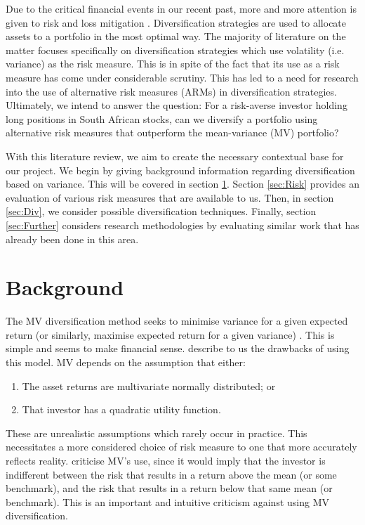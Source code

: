 \documentclass[12pt,a4paper]{article}
\newcommand{\be}{\begin{enumerate}}
\newcommand{\ee}{\end{enumerate}}
\begin{document}
Due to the critical financial events in our recent past, more and more attention is given to risk and loss mitigation \citep{righi2017simulation}. Diversification strategies are used to allocate assets to a portfolio in the most optimal way. The majority of literature on the matter focuses specifically on diversification strategies which use volatility (i.e. variance) as the risk measure. This is in spite of the fact that its use as a risk measure has come under considerable scrutiny. This has led to a need for research into the use of alternative risk measures (ARMs) in diversification strategies. Ultimately, we intend to answer the question: For a risk-averse investor holding long positions in South African stocks, can we diversify a portfolio using alternative risk measures that outperform the mean-variance (MV) portfolio?

With this literature review, we aim to create the necessary contextual base for our project. We begin by giving background information regarding diversification based on variance. This will be covered in section \ref{sec:Back}. Section \ref{sec:Risk} provides an evaluation of various risk measures that are available to us. Then, in section \ref{sec:Div}, we consider possible diversification techniques. Finally, section \ref{sec:Further} considers research methodologies by evaluating similar work that has already been done in this area.

\section{Background}
\label{sec:Back}

The MV diversification method seeks to minimise variance for a given expected return (or similarly, maximise expected return for a given variance) \citep{markowitz1952portfolio}. This is simple and seems to make financial sense. \cite{hoe2010empirical} describe to us the drawbacks of using this model. MV depends on the assumption that either:
\be
\item The asset returns are multivariate normally distributed; or
\item That investor has a quadratic utility function.
\ee
These are unrealistic assumptions which rarely occur in practice. This necessitates a more considered choice of risk measure to one that more accurately reflects reality. \cite{byrne2004different} criticise MV's use, since it would imply that the investor is indifferent between the risk that results in a return above the mean (or some benchmark), and the risk that results in a return below that same mean (or benchmark). This is an important and intuitive criticism against using MV diversification. 
\end{document}
